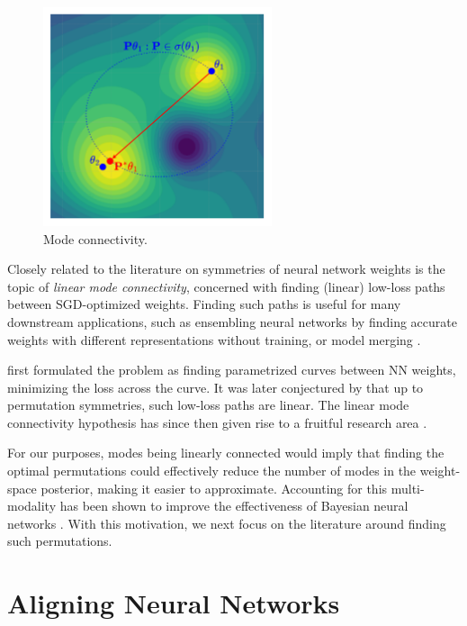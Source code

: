 \begin{figure}[t!]
    \centering
    \includegraphics[width=0.6\textwidth]{figures/mode_connectivity.drawio.pdf}
    \caption{\label{fig:mode_conn} Mode connectivity.}    
\end{figure}


Closely related to the literature on symmetries of neural network weights is the topic of \textit{linear mode connectivity}, concerned with finding (linear) low-loss paths between SGD-optimized weights. Finding such paths is useful for many downstream applications, such as ensembling neural networks \citep{garipovLossSurfacesMode2018a} by finding accurate weights with different representations without training, or model merging \citep{stoicaZipItMergingModels2024}.

\citet{garipovLossSurfacesMode2018a} first formulated the problem as finding parametrized curves between NN weights, minimizing the loss across the curve. It was later conjectured by \citet{entezariRolePermutationInvariance2022} that up to permutation symmetries, such low-loss paths are linear. The linear mode connectivity hypothesis has since then given rise to a fruitful research area \citep{ferbachProvingLinearMode2024,rossiPermutationSymmetriesBayesian2023,zhaoUnderstandingModeConnectivity2023}. 

For our purposes, modes being linearly connected would imply that finding the optimal permutations could effectively reduce the number of modes in the weight-space posterior, making it easier to approximate. Accounting for this multi-modality has been shown to improve the effectiveness of Bayesian neural networks \citep{sommerConnectingDotsModeConnectedness2024}. With this motivation, we next focus on the literature around finding such permutations. 

\section{Aligning Neural Networks}

